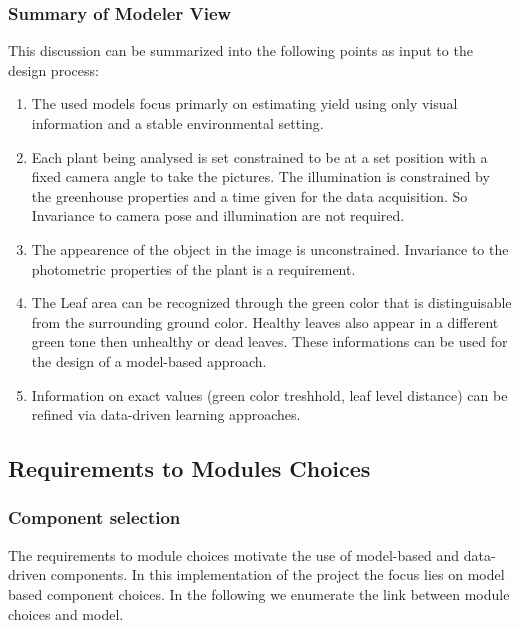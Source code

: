 \graphicspath{{members/paz/figures/}}

\subsubsection{Summary of Modeler View}


This discussion can be summarized into the following points as input to the
design process:

\begin{enumerate}
    \item The used models focus primarly on estimating yield using only visual information and a stable environmental setting.
    
    \item Each plant being analysed is set constrained to be at a set position with a fixed camera angle to take the pictures. The illumination is constrained by the greenhouse properties and a time given for the data acquisition. So Invariance to camera pose and illumination are not required.
    
    \item The appearence of the object in the image is unconstrained. Invariance to the photometric properties of the plant is a requirement.
    
    \item The Leaf area can be recognized through the green color that is distinguisable from the surrounding ground color. Healthy leaves also appear in a  different green tone then unhealthy or dead leaves. These informations can be used for the design of a model-based approach.
    
    \item Information on exact values (green color treshhold, leaf level distance) can be refined via data-driven learning approaches.
    
\end{enumerate}

\subsection{Requirements to Modules Choices}

\subsubsection{Component selection}

The requirements to module choices motivate the use of model-based and data-driven components. In this implementation of the project the focus lies on model based component choices. In the following we enumerate the link between module choices and model.

